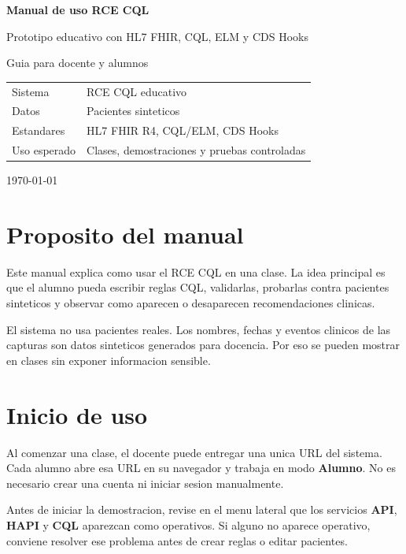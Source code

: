 \documentclass[12pt,letterpaper]{article}
\begin{document}
\begin{titlepage}
  \centering
  \vspace*{2cm}
  {\Huge \textbf{Manual de uso RCE CQL}\par}
  \vspace{0.5cm}
  {\Large Prototipo educativo con HL7 FHIR, CQL, ELM y CDS Hooks\par}
  \vspace{1.5cm}
  {\large Guia para docente y alumnos\par}
  \vfill
  \begin{tabular}{ll}
    Sistema & RCE CQL educativo \\
    Datos & Pacientes sinteticos \\
    Estandares & HL7 FHIR R4, CQL/ELM, CDS Hooks \\
    Uso esperado & Clases, demostraciones y pruebas controladas \\
  \end{tabular}
  \vfill
  {\large \today\par}
\end{titlepage}

\tableofcontents
\newpage

\section{Proposito del manual}

Este manual explica como usar el RCE CQL en una clase. La idea principal es que
el alumno pueda escribir reglas CQL, validarlas, probarlas contra pacientes
sinteticos y observar como aparecen o desaparecen recomendaciones clinicas.

El sistema no usa pacientes reales. Los nombres, fechas y eventos clinicos de
las capturas son datos sinteticos generados para docencia. Por eso se pueden
mostrar en clases sin exponer informacion sensible.

\section{Inicio de uso}

Al comenzar una clase, el docente puede entregar una unica URL del sistema. Cada
alumno abre esa URL en su navegador y trabaja en modo \textbf{Alumno}. No es
necesario crear una cuenta ni iniciar sesion manualmente.

Antes de iniciar la demostracion, revise en el menu lateral que los servicios
\textbf{API}, \textbf{HAPI} y \textbf{CQL} aparezcan como operativos. Si alguno
no aparece operativo, conviene resolver ese problema antes de crear reglas o
editar pacientes.
\end{document}
